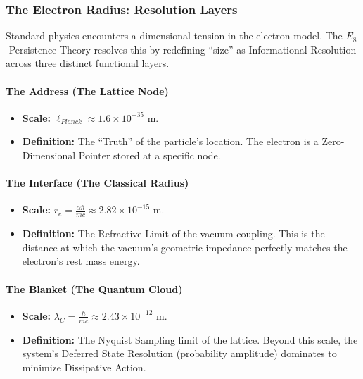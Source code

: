 \subsubsection{The Electron Radius: Resolution Layers}

Standard physics encounters a dimensional tension in the electron model. The $E_8$-Persistence Theory resolves this by redefining ``size'' as Informational Resolution across three distinct functional layers.

\paragraph{The Address (The Lattice Node)}
\begin{itemize}
    \item \textbf{Scale:} $\ell_{Planck} \approx 1.6 \times 10^{-35}$ m.
    \item \textbf{Definition:} The ``Truth'' of the particle's location. The electron is a Zero-Dimensional Pointer stored at a specific node.
\end{itemize}

\paragraph{The Interface (The Classical Radius)}
\begin{itemize}
    \item \textbf{Scale:} $r_e = \frac{\alpha \hbar}{mc} \approx 2.82 \times 10^{-15}$ m.
    \item \textbf{Definition:} The Refractive Limit of the vacuum coupling. This is the distance at which the vacuum's geometric impedance perfectly matches the electron's rest mass energy.
\end{itemize}

\paragraph{The Blanket (The Quantum Cloud)}
\begin{itemize}
    \item \textbf{Scale:} $\lambda_C = \frac{h}{mc} \approx 2.43 \times 10^{-12}$ m.
    \item \textbf{Definition:} The Nyquist Sampling limit of the lattice. Beyond this scale, the system's Deferred State Resolution (probability amplitude) dominates to minimize Dissipative Action.
\end{itemize}
